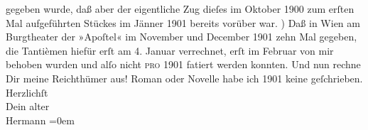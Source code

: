 \begin{ledgroupsized}[t]{13cm}
               gegeben wurde, daß aber der eigentliche Zug dieſes im Oktober 1900 zum erſten Mal
               aufgeführten Stückes im Jänner 1901 bereits vorüber war.\pend
           ) Daß in Wien am Burgtheater der »Apoſtel« im November
               und December 1901 zehn Mal gegeben, die {\pb}Tantièmen
               hiefür erſt am 4. Januar verrechnet, erſt im Februar von mir behoben wurden und alſo
               nicht \textsc{pro} 1901 fatiert werden konnten. Und nun rechne Dir
               meine Reichthümer aus! Roman oder Novelle habe ich 1901 keine geſchrieben.\pend
           \pstart
           Herzlichſt{\\[\baselineskip]}Dein alter{\\[\baselineskip]}\spacefill\mbox{Hermann}\pend
           \leftskip=0em{}          \endnumbering{}\end{ledgroupsized}  \newcommand{\dateiname}{L01230}\newcommand{\titel}{Hermann Bahr an Arthur Schnitzler, 10. 7. [1902]}\newcommand{\editorInnen}{ Kurt Ifkovits,  Martin Anton Müller}
      